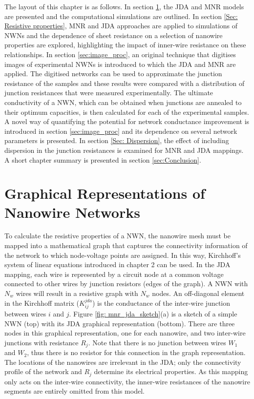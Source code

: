 The layout of this chapter is as follows. In section \ref{sec:Graphical Representations of NWNs}, the JDA and MNR models are presented and the computational simulations are outlined. In section \ref{Sec: Resistive properties}, MNR and JDA approaches are applied to simulations of NWNs and the dependence of sheet resistance on a selection of nanowire properties are explored, highlighting the impact of inner-wire resistance on these relationships. In section \ref{sec:image_proc}, an original technique that digitises images of experimental NWNs is introduced to which the JDA and MNR are applied. The digitised networks can be used to approximate the junction resistance of the samples and these results were compared with a distribution of junction resistances that were measured experimentally\cite{bellew2015}. The ultimate conductivity of a NWN, which can be obtained when junctions are annealed to their optimum capacities, is then calculated for each of the experimental samples. A novel way of quantifying the potential for network conductance improvement is introduced in section \ref{sec:image_proc} and its dependence on several network parameters is presented\cite{rocha2015}. In section \ref{Sec: Dispersion}, the effect of including dispersion in the junction resistances is examined for MNR and JDA mappings. A short chapter summary is presented in section \ref{sec:Conclusion}.
\section{Graphical Representations of Nanowire Networks}
\label{sec:Graphical Representations of NWNs}

To calculate the resistive properties of a NWN, the nanowire mesh must be mapped into a mathematical graph that captures the connectivity information of the network to which node-voltage points are assigned. In this way, Kirchhoff's system of linear equations introduced in chapter 2 can be used. In the JDA mapping, each wire is represented by a circuit node at a common voltage connected to other wires by junction resistors (edges of the graph). A NWN with $N_w$ wires will result in a resistive graph with $N_w$ nodes. An off-diagonal element in the Kirchhoff matrix ($K^{jda}_{ij}$) is the conductance of the inter-wire junction between wires $i$ and $j$. Figure \ref{fig: mnr_jda_sketch}(a) is a sketch of a simple NWN (top) with its JDA graphical representation (bottom). There are three nodes in this graphical representation, one for each nanowire, and two inter-wire junctions with resistance $R_j$. Note that there is no junction between wires $W_1$ and $W_2$, thus there is no resistor for this connection in the graph representation. The locations of the nanowires are irrelevant in the JDA; only the connectivity profile of the network and $R_j$ determine its electrical properties. As this mapping only acts on the inter-wire connectivity, the inner-wire resistances of the nanowire segments are entirely omitted from this model.

